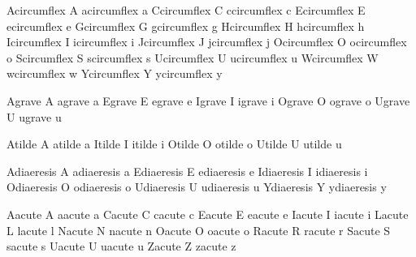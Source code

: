 
\startencoding[raw]

 Acircumflex {A}  acircumflex {a}
 Ccircumflex {C}  ccircumflex {c} 
 Ecircumflex {E}  ecircumflex {e}
 Gcircumflex {G}  gcircumflex {g}
 Hcircumflex {H}  hcircumflex {h}
 Icircumflex {I}  icircumflex {i}
 Jcircumflex {J}  jcircumflex {j}
 Ocircumflex {O}  ocircumflex {o}
 Scircumflex {S}  scircumflex {s}
 Ucircumflex {U}  ucircumflex {u}
 Wcircumflex {W}  wcircumflex {w}
 Ycircumflex {Y}  ycircumflex {y}
     
 Agrave {A}  agrave {a}
 Egrave {E}  egrave {e}
 Igrave {I}  igrave {i}
 Ograve {O}  ograve {o}
 Ugrave {U}  ugrave {u}
     
 Atilde {A}  atilde {a}
 Itilde {I}  itilde {i}
 Otilde {O}  otilde {o}
 Utilde {U}  utilde {u}

 Adiaeresis {A}  adiaeresis {a}
 Ediaeresis {E}  ediaeresis {e}
 Idiaeresis {I}  idiaeresis {i}
 Odiaeresis {O}  odiaeresis {o}
 Udiaeresis {U}  udiaeresis {u}
 Ydiaeresis {Y}  ydiaeresis {y}

 Aacute {A}  aacute {a}
 Cacute {C}  cacute {c}
 Eacute {E}  eacute {e}
 Iacute {I}  iacute {i}
 Lacute {L}  lacute {l}
 Nacute {N}  nacute {n}
 Oacute {O}  oacute {o}
 Racute {R}  racute {r}
 Sacute {S}  sacute {s}
 Uacute {U}  uacute {u}
 Zacute {Z}  zacute {z}

